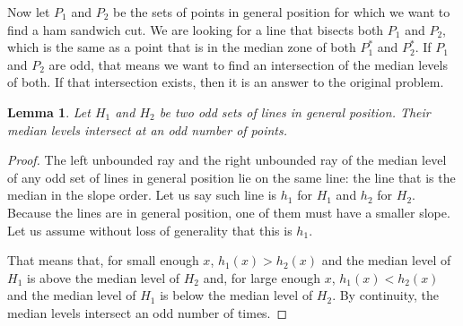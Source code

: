 \documentclass{article}
\newtheorem{lemma}{Lemma}
\begin{document}
Now let $P_1$ and $P_2$ be the sets of points in general position for which we want to find a ham sandwich cut. We are looking for a line that bisects both $P_1$ and $P_2$, which is the same as a point that is in the median zone of both $P_1^*$ and $P_2^*$. If $P_1$ and $P_2$ are odd, that means we want to find an intersection of the median levels of both. If that intersection exists, then it is an answer to the original problem.

\begin{lemma}
\label{odd_intersection_lemma}
Let $H_1$ and $H_2$ be two odd sets of lines in general position. Their median levels intersect at an odd number of points.
\end{lemma}
\begin{proof}
    The left unbounded ray and the right unbounded ray of the median level of any odd set of lines in general position lie on the same line: the line that is the median in the slope order. Let us say such line is $h_1$ for $H_1$ and  $h_2$ for $H_2$. Because the lines are in general position, one of them must have a smaller slope. Let us assume without loss of generality that this is $h_1$.
    
    That means that, for small enough $x$, $h_1(x)>h_2(x)$ and the median level of $H_1$ is above the median level of $H_2$ and, for large enough $x$, $h_1(x)<h_2(x)$ and the median level of $H_1$ is below the median level of $H_2$. By continuity, the median levels intersect an odd number of times. 
\end{proof}
\end{document}
